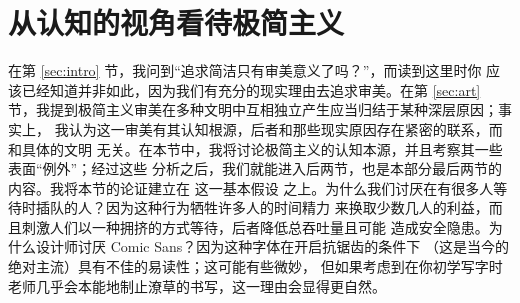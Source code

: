 \section{从认知的视角看待极简主义}\label{sec:cognitive}

在第 \ref{sec:intro} 节，我问到“追求简洁只有审美意义了吗？”，而读到这里时你
应该已经知道并非如此，因为我们有充分的现实理由去追求审美。在第 \ref{sec:art}
节，我提到极简主义审美在多种文明中互相独立产生应当归结于某种深层原因；事实上，
我认为这一审美有其认知根源，后者和那些现实原因存在紧密的联系，而和具体的文明
无关。在本节中，我将讨论极简主义的认知本源，并且考察其一些表面“例外”；经过这些
分析之后，我们就能进入后两节，也是本部分最后两节的内容。我将本节的论证建立在%
这一基本假设
之上。为什么我们讨厌在有很多人等待时插队的人？因为这种行为牺牲许多人的时间精力
来换取少数几人的利益，而且刺激人们以一种拥挤的方式等待，后者降低总吞吐量且可能
造成安全隐患。为什么设计师讨厌 Comic Sans？因为这种字体在开启抗锯齿的条件下
（这是当今的绝对主流）具有不佳的易读性；这可能有些微妙，
但如果考虑到在你初学写字时老师几乎会本能地制止潦草的书写，这一理由会显得更自然。

